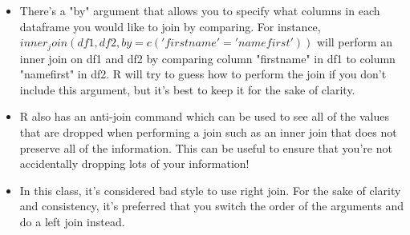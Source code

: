 \begin{itemize}
\item There's a "by" argument that allows you to specify what columns in each dataframe you would like to join by comparing. For instance, $inner_join(df1, df2, by=c('firstname'='namefirst'))$ will perform an inner join on df1 and df2 by comparing column "firstname" in df1 to column "namefirst" in df2. R will try to guess how to perform the join if you don't include this argument, but it's best to keep it for the sake of clarity. 
\item R also has an anti-join command which can be used to see all of the values that are dropped when performing a join such as an inner join that does not preserve all of the information. This can be useful to ensure that you're not accidentally dropping lots of your information!
\item In this class, it's considered bad style to use right join. For the sake of clarity and consistency, it's preferred that you switch the order of the arguments and do a left join instead.

\end{itemize}
